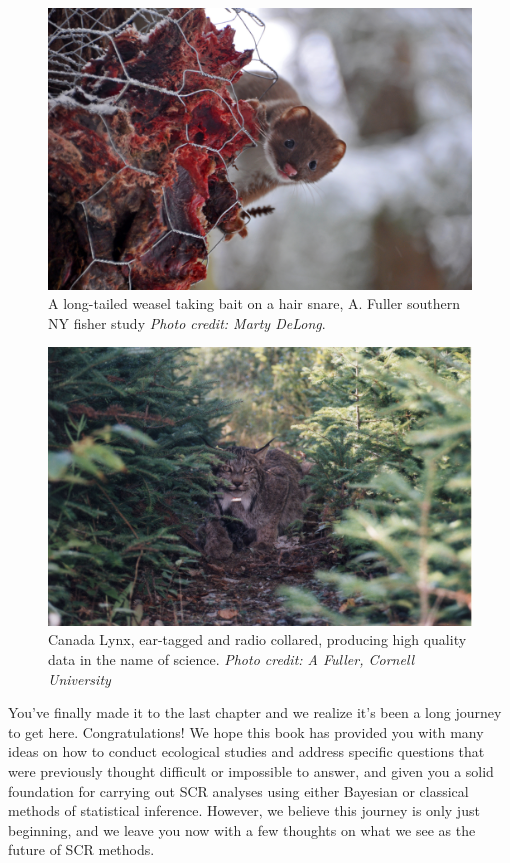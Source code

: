 \begin{figure}[h!]
\centering
\includegraphics[width=\textwidth]{Ch20-Last/weasel.jpg}
\caption{
A long-tailed weasel taking bait on a hair snare, A. Fuller southern NY fisher study
{\it Photo credit: Marty DeLong}.
}
\label{last.fig.weasels}
\end{figure}



\begin{figure}[h!]
\centering
\includegraphics[width=\textwidth]{Ch20-Last/lynx.jpg}
\caption{
Canada Lynx, ear-tagged and radio collared, producing high quality
data in the name of science.
{\it Photo credit: A Fuller, Cornell University} }
\label{last.fig.lynx}
\end{figure}

You've finally made it to the last chapter and we realize it's been a
long journey to get here. Congratulations!  We hope this book has
provided you with many ideas on how to conduct ecological studies and
address specific questions that were previously thought difficult or
impossible to answer, and given you a solid foundation for carrying
out SCR analyses using either Bayesian or classical methods of
statistical inference.  However, we believe this journey is only just
beginning, and we leave you now with a few thoughts on what we see as
the future of SCR methods.

